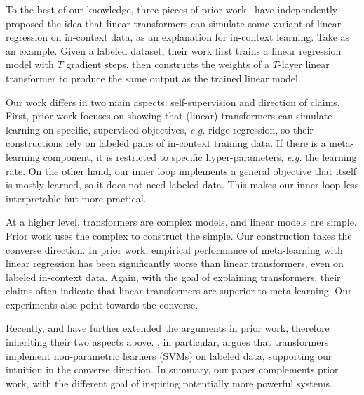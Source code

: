 \documentclass{article} %
\begin{document}

To the best of our knowledge, three pieces of prior work~\citep{akyurek2022learning,dai2022can,von2023transformers}
have independently proposed the idea that linear transformers can simulate some variant of linear regression on in-context data, as an explanation for in-context learning.
Take \cite{von2023transformers} as an example. Given a labeled dataset, their work first trains a linear regression model with $T$ gradient steps, then constructs the weights of a $T$-layer linear transformer to produce the same output as the trained linear model.

Our work differs in two main aspects: self-supervision and direction of claims.
First, prior work focuses on showing that (linear) transformers can simulate learning on specific, supervised objectives, \textit{e.g.} ridge regression, so their constructions rely on labeled pairs of in-context training data.
If there is a meta-learning component, it is restricted to specific hyper-parameters, \textit{e.g.} the learning rate.
On the other hand, our inner loop implements a general objective that itself is mostly learned, so it does not need labeled data.
This makes our inner loop less interpretable but more practical.

At a higher level, transformers are complex models, and linear models are simple. 
Prior work uses the complex to construct the simple. 
Our construction takes the converse direction. 
In prior work, empirical performance of meta-learning with linear regression has been significantly worse than linear transformers, even on labeled in-context data.
Again, with the goal of explaining transformers, their claims often indicate that linear transformers are superior to meta-learning.
Our experiments also point towards the converse.

Recently, \cite{mahankali2023one,zhang2023trained,ahn2023transformers} and \cite{tarzanagh2023transformers} have further extended the arguments in prior work, therefore inheriting their two aspects above.
\cite{tarzanagh2023transformers}, in particular, argues that transformers implement non-parametric learners (SVMs) on labeled data, supporting our intuition in the converse direction.
In summary, our paper complements prior work, with the different goal of inspiring potentially more powerful systems.
\end{document}
